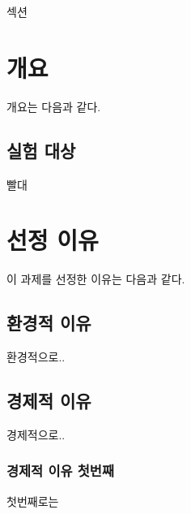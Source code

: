 \documentclass{article}
\begin{document}
{\Huge 섹션}

\section{개요}
개요는 다음과 같다.

\subsection{실험 대상}
빨대


\section{선정 이유}
이 과제를 선정한 이유는 다음과 같다. 

\subsection{환경적 이유}
환경적으로.. 

\subsection{경제적 이유}
경제적으로.. 

\subsubsection{경제적 이유 첫번째}
첫번째로는
\end{document}
